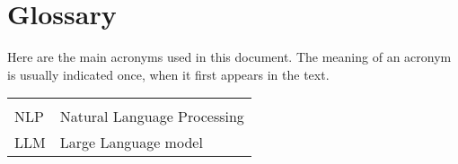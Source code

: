 \chapter*{Glossary}

Here are the main acronyms used in this document. The meaning of an acronym is usually indicated once, when it first appears in the text.

\begin{longtable}{lp{9cm}}
        &                             \\
    NLP & Natural Language Processing \\
    LLM & Large Language model        \\
\end{longtable}
